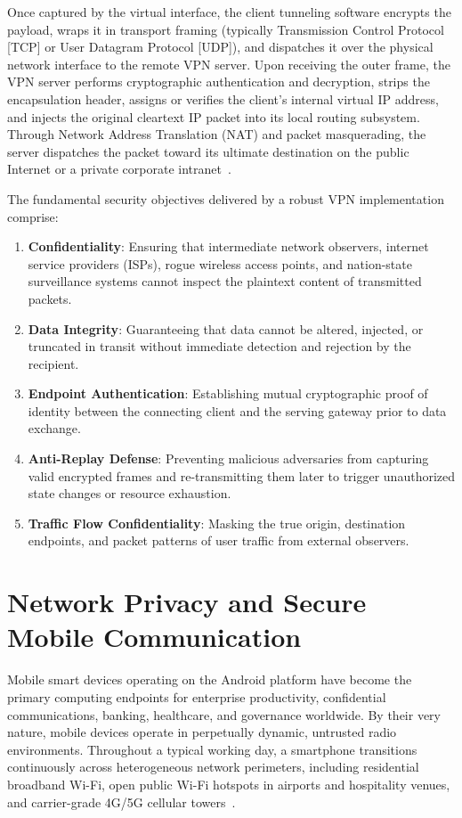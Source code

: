 Once captured by the virtual interface, the client tunneling software encrypts the payload, wraps it in transport framing (typically Transmission Control Protocol [TCP] or User Datagram Protocol [UDP]), and dispatches it over the physical network interface to the remote VPN server. Upon receiving the outer frame, the VPN server performs cryptographic authentication and decryption, strips the encapsulation header, assigns or verifies the client's internal virtual IP address, and injects the original cleartext IP packet into its local routing subsystem. Through Network Address Translation (NAT) and packet masquerading, the server dispatches the packet toward its ultimate destination on the public Internet or a private corporate intranet~\cite{ikram2016measuring}.

The fundamental security objectives delivered by a robust VPN implementation comprise:
\begin{enumerate}[label=(\roman*)]
    \item \textbf{Confidentiality}: Ensuring that intermediate network observers, internet service providers (ISPs), rogue wireless access points, and nation-state surveillance systems cannot inspect the plaintext content of transmitted packets.
    \item \textbf{Data Integrity}: Guaranteeing that data cannot be altered, injected, or truncated in transit without immediate detection and rejection by the recipient.
    \item \textbf{Endpoint Authentication}: Establishing mutual cryptographic proof of identity between the connecting client and the serving gateway prior to data exchange.
    \item \textbf{Anti-Replay Defense}: Preventing malicious adversaries from capturing valid encrypted frames and re-transmitting them later to trigger unauthorized state changes or resource exhaustion.
    \item \textbf{Traffic Flow Confidentiality}: Masking the true origin, destination endpoints, and packet patterns of user traffic from external observers.
\end{enumerate}

\section{Network Privacy and Secure Mobile Communication}
\label{sec:network_privacy_mobile}

Mobile smart devices operating on the Android platform have become the primary computing endpoints for enterprise productivity, confidential communications, banking, healthcare, and governance worldwide. By their very nature, mobile devices operate in perpetually dynamic, untrusted radio environments. Throughout a typical working day, a smartphone transitions continuously across heterogeneous network perimeters, including residential broadband Wi-Fi, open public Wi-Fi hotspots in airports and hospitality venues, and carrier-grade 4G/5G cellular towers~\cite{mavroudis2017touchlog}.

